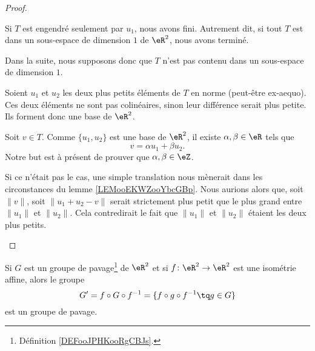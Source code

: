 \begin{proof}
\begin{subproof}

		Si \( T\) est engendré seulement par \( u_1\), nous avons fini. Autrement dit, si tout \( T\) est dans un sous-espace de dimension \( 1\) de \( \eR^2\), nous avons terminé.

		Dans la suite, nous supposons donc que \( T\) n'est pas contenu dans un sous-espace de dimension \( 1\).

		\spitem[\( T=\eZ u_1 + \eZ u_2\)]
		Soient \( u_1\) et \( u_2\) les deux plus petits éléments de \( T\) en norme (peut-être ex-aequo). Ces deux éléments ne sont pas colinéaires, sinon leur différence serait plus petite. Ils forment donc une base de \( \eR^2\).

		Soit \( v\in T\). Comme \( \{ u_1,u_2 \}\) est une base de \( \eR^2\), il existe \( \alpha,\beta\in \eR\) tels que
		\begin{equation}
			v=\alpha u_1+\beta u_2.
		\end{equation}
		Notre but est à présent de prouver que \( \alpha,\beta\in \eZ\).

		Si ce n'était pas le cas, une simple translation nous mènerait dans les circonstances du lemme \ref{LEMooEKWZooYbcGBp}. Nous aurions alors que, soit \( \| v \|\), soit \(\| u_1+u_2-v \|\) serait strictement plus petit que le plus grand entre \( \| u_1 \|\) et \( \| u_2 \|\). Cela contredirait le fait que \( \| u_1 \|\) et \( \| u_2 \|\) étaient les deux plus petits.
	\end{subproof}
\end{proof}

\begin{proposition}      \label{PROPooPQYXooIDZlHy}
	Si \( G\) est un groupe de pavage\footnote{Définition \ref{DEFooJPHKooRgCBJs}.} de \( \eR^2\) et si \( f\colon \eR^2\to \eR^2\) est une isométrie affine, alors le groupe
	\begin{equation}
		G'=f\circ G\circ f^{-1}=\{f\circ g\circ f^{-1}\tq g\in G\}
	\end{equation}
	est un groupe de pavage.
\end{proposition}

